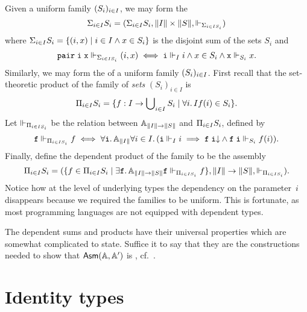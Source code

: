 Given a uniform family $(\asm{S}_i)_{i \in \asm{I}}$, we may form the
%
\begin{equation*}
  \dsum_{i \in \asm{I}} \asm{S}_i =
  (\dsum_{i \in I} S_i, \T{I} \times \T{S}, \rz[\dsum_{i \in I S_i}])
\end{equation*}
%
where $\dsum_{i \in I} S_i = \set{(i,x) \such i \in I \land x \in
  S_i}$ is the disjoint sum of the sets $S_i$ and
%
\begin{equation*}
  \combPair\;\R{i}\;\R{x} \rz[\dsum_{i \in I S_i}] (i, x)
  \iff
  \R{i} \rz[I] i
  \land
  x \in S_i
  \land
  \R{x} \rz[S_i] x.  
\end{equation*}
%
Similarly, we may form the  of a uniform
family $(\asm{S}_i)_{i \in \asm{I}}$. First recall that the
set-theoretic product of the family of \emph{sets} $(S_i)_{i \in I}$
is
%
\begin{equation*}
  \dprod_{i \in I} S_i =
  \set{f : I \to \tbigcup_{i \in I} S_i \such
    \all{i}{I}{f(i) \in S_i}
  }.
\end{equation*}
%
Let $\rz[\dprod_{i \in I S_i}]$ be the relation between $\Atyp{\T{I}
  \to \T{S}}$ and $\dprod_{i \in I} S_i$, defined by
%
\begin{equation*}
  \R{f} \rz[\dprod_{i \in I S_i}] f
  \iff
  \all{\R{i}}{\Atyp{\T{I}}}{
    \all{i \in I}
      (\R{i} \rz[I] i
      \implies
      \defined{\R{f}\;\R{i}} \land
      \R{f}\;\R{i} \rz[S_i] f(i))
  }.
\end{equation*}
%
Finally, define the dependent product of the family to be the assembly
%
\begin{equation*}
  \dprod_{i \in \asm{I}} \asm{S}_i =
  (\set{f \in \dprod_{i \in I} S_i \such
    \some{\R{f}}{\Atyp{\T{I} \to \T{S}}}{\R{f} \rz[\dprod_{i \in I S_i}]
      f}},
  \T{I} \to \T{S}, {\rz[\dprod_{i \in I S_i}]}).
\end{equation*}
%
Notice how at the level of underlying types the dependency on the
parameter~$i$ disappears because we required the families to be
uniform. This is fortunate, as most programming languages are not
equipped with dependent types.

The dependent sums and products have their universal properties which
are somewhat complicated to state. Suffice it to say that they are the
constructions needed to show that $\AsmA$ is , cf.\ .

\section{Identity types}
\label{sec:identity-types}

